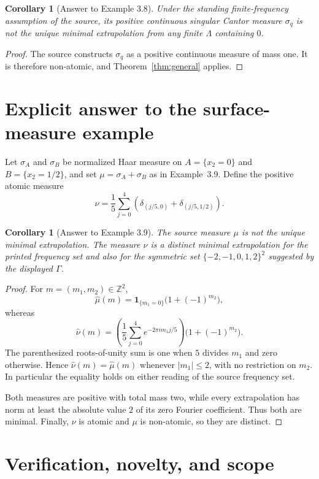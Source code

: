 \documentclass[11pt,a4paper]{article}
\newtheorem{corollary}[theorem]{Corollary}
\newcommand{\Z}{\mathbb{Z}}
\begin{document}
\begin{corollary}[Answer to Example 3.8]
Under the standing finite-frequency assumption of the source, its positive
continuous singular Cantor measure $\sigma_q$ is not the unique minimal
extrapolation from any finite $\Lambda$ containing $0$.
\end{corollary}

\begin{proof}
The source constructs $\sigma_q$ as a positive continuous measure of mass one.
It is therefore non-atomic, and Theorem~\ref{thm:general} applies.
\end{proof}

\section{Explicit answer to the surface-measure example}

Let $\sigma_A$ and $\sigma_B$ be normalized Haar measure on
$A=\{x_2=0\}$ and $B=\{x_2=1/2\}$, and set $\mu=\sigma_A+\sigma_B$ as in
Example~3.9.  Define the positive atomic measure
\[
 \nu=\frac15\sum_{j=0}^{4}
 \left(\delta_{(j/5,0)}+\delta_{(j/5,1/2)}\right).
\]

\begin{corollary}[Answer to Example 3.9]
The source measure $\mu$ is not the unique minimal extrapolation.  The measure
$\nu$ is a distinct minimal extrapolation for the printed frequency set and
also for the symmetric set $\{-2,-1,0,1,2\}^2$ suggested by the displayed
$\Gamma$.
\end{corollary}

\begin{proof}
For $m=(m_1,m_2)\in\Z^2$,
\[
 \widehat\mu(m)=\mathbf{1}_{\{m_1=0\}}
                    \bigl(1+(-1)^{m_2}\bigr),
\]
whereas
\[
 \widehat\nu(m)=
 \left(\frac15\sum_{j=0}^{4}e^{-2\pi i m_1j/5}\right)
 \bigl(1+(-1)^{m_2}\bigr).
\]
The parenthesized roots-of-unity sum is one when $5$ divides $m_1$ and zero
otherwise.  Hence $\widehat\nu(m)=\widehat\mu(m)$ whenever $|m_1|\le2$,
with no restriction on $m_2$.  In particular the equality holds on either
reading of the source frequency set.

Both measures are positive with total mass two, while every extrapolation has
norm at least the absolute value $2$ of its zero Fourier coefficient.  Thus
both are minimal.  Finally, $\nu$ is atomic and $\mu$ is non-atomic, so they
are distinct.
\end{proof}

\section{Verification, novelty, and scope}
\end{document}
